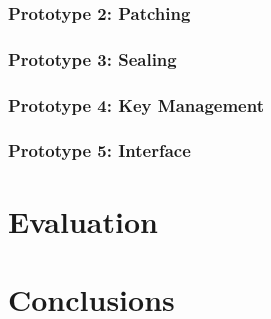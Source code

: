 \documentclass[a4paper, 12pt]{report}
\begin{document}
\subsection{Prototype 2: Patching}


\subsection{Prototype 3: Sealing}


\subsection{Prototype 4: Key Management}


\subsection{Prototype 5: Interface}


\chapter{Evaluation}


\chapter{Conclusions}





\end{document}
